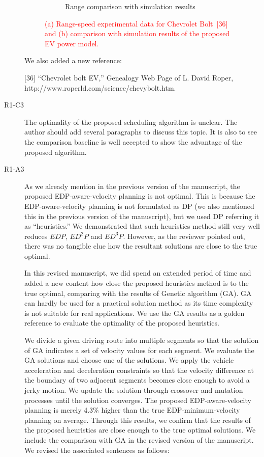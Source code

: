 \documentclass[onecolumn]{IEEEconf}
\begin{document}
\begin{description}
\begin{figure} [h!]
\begin{subfigure}{0.47\textwidth}
	\caption{Range comparison with simulation results}
	\label{fig:range_speed_valid}
	\end{subfigure}
\caption{\textcolor{red}{(a) Range-speed experimental data for Chevrolet Bolt~[36] and (b) comparison with simulation results of the proposed EV power model.}}
\end{figure}

We also added a new reference:

[36] ``Chevrolet bolt EV,'' Genealogy Web Page of L. David Roper, http://www.roperld.com/science/chevybolt.htm.

\item [R1-C3] The optimality of the proposed scheduling algorithm is unclear. The author should add several paragraphs to discuss this topic. It is also to see the comparison baseline is well accepted to show the advantage of the proposed algorithm.

\item [R1-A3] As we already mention in the previous version of the manuscript, the proposed EDP-aware-velocity planning is not optimal. This is because the EDP-aware-velocity planning is not formulated as DP (we also mentioned this in the previous version of the manuscript), but we used DP referring it as ``heuristics.'' We demonstrated that such heuristics method still very well reduces $EDP$, $ED^2P$ and $ED^3P$. However, as the reviewer pointed out, there was no tangible clue how the resultant solutions are close to the true optimal.

In this revised manuscript, we did spend an extended period of time and added a new content  how close the proposed heuristics method is to the true optimal, comparing with the results of Genetic algorithm (GA). GA can hardly be used for a practical solution method as its time complexity is not suitable for real applications. We use the GA results as a golden reference to evaluate the optimality of the proposed heuristics.

We divide a given driving route into multiple segments so that the solution of GA indicates a set of velocity values for each segment. We evaluate the GA solutions and choose one of the solutions. We apply the vehicle acceleration and deceleration constraints so that the velocity difference at the boundary of two adjacent segments becomes close enough to avoid a jerky motion. We update the solution through crossover and mutation processes until the solution converges. The proposed EDP-aware-velocity planning is merely 4.3\% higher than the true EDP-minimum-velocity planning on average. Through this results, we confirm that the results of the proposed heuristics are close enough to the true optimal solutions. We include the comparison with GA in the revised version of the manuscript. We revised the associated sentences as follows:\\


\end{description}
\end{document}
